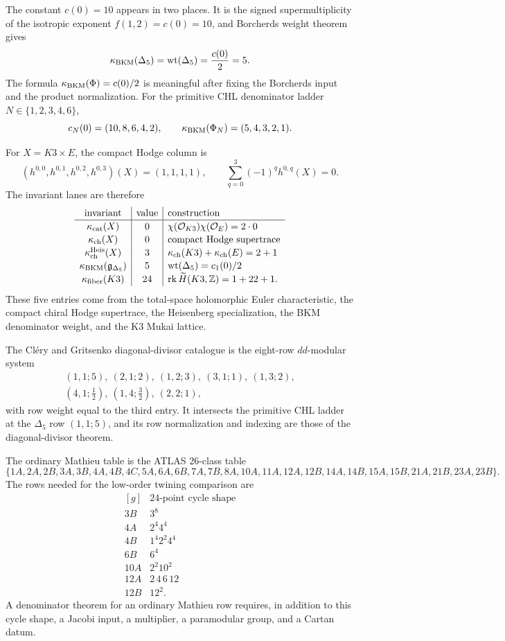 The constant \(c(0)=10\) appears in two places.  It is the signed
supermultiplicity of the isotropic exponent \(f(1,2)=c(0)=10\), and
Borcherds weight theorem gives
\[
  \kappa_{\mathrm{BKM}}(\Delta_5)
  =
  \operatorname{wt}(\Delta_5)
  =
  \frac{c(0)}{2}
  =
  5 .
\]
The formula \(\kappa_{\mathrm{BKM}}(\Phi)=c(0)/2\) is meaningful after fixing the
Borcherds input and the product normalization.  For the primitive CHL
denominator ladder \(N\in\{1,2,3,4,6\}\),
\[
  c_N(0)=(10,8,6,4,2),
  \qquad
  \kappa_{\mathrm{BKM}}(\Phi_N)=(5,4,3,2,1).
\]

For \(X=K3\times E\), the compact Hodge column is
\[
  (h^{0,0},h^{0,1},h^{0,2},h^{0,3})(X)=(1,1,1,1),
  \qquad
  \sum_{q=0}^{3}(-1)^q h^{0,q}(X)=0.
\]
The invariant lanes are therefore
\[
  \renewcommand{\arraystretch}{1.12}
  \begin{array}{c|c|l}
  \text{invariant} & \text{value} & \text{construction}\\ \hline
  \kappaCat(X) & 0 &
    \chi(\mathcal O_{K3})\chi(\mathcal O_E)=2\cdot 0\\
  \kappaCh(X) & 0 &
    \text{compact Hodge supertrace}\\
  \kappaHeis(X) & 3 &
    \kappaCh(K3)+\kappaCh(E)=2+1\\
  \kappaBKM(\gDeltaFive) & 5 &
    \operatorname{wt}(\Delta_5)=c_1(0)/2\\
  \kappaFiber(K3) & 24 &
    \operatorname{rk}\widetilde H(K3,\Z)=1+22+1 .
  \end{array}
\]
These five entries come from the total-space holomorphic Euler
characteristic, the compact chiral Hodge supertrace, the Heisenberg
specialization, the BKM denominator weight, and the K3 Mukai lattice.

The Cl\'ery and Gritsenko diagonal-divisor catalogue is the eight-row
\(dd\)-modular system
\[
\begin{gathered}
  (1,1;5),\ (2,1;2),\ (1,2;3),\ (3,1;1),\ (1,3;2),\\
  (4,1;\tfrac12),\ (1,4;\tfrac32),\ (2,2;1),
\end{gathered}
\]
with row weight equal to the third entry.  It intersects the primitive
CHL ladder at the \(\Delta_5\) row \((1,1;5)\), and its row
normalization and indexing are those of the diagonal-divisor theorem.

The ordinary Mathieu table is the ATLAS \(26\)-class table
\[
\{1A,2A,2B,3A,3B,4A,4B,4C,5A,6A,6B,7A,7B,
8A,10A,11A,12A,12B,14A,14B,15A,15B,21A,21B,23A,23B\}.
\]
The rows needed for the low-order twining comparison are
\[
  \renewcommand{\arraystretch}{1.12}
  \begin{array}{c|c}
  [g] & \text{\(24\)-point cycle shape}\\ \hline
  3B & 3^8\\
  4A & 2^4 4^4\\
  4B & 1^4 2^2 4^4\\
  6B & 6^4\\
  10A & 2^2 10^2\\
  12A & 2\,4\,6\,12\\
  12B & 12^2 .
  \end{array}
\]
A denominator theorem for an ordinary Mathieu row requires, in addition
to this cycle shape, a Jacobi input, a multiplier, a paramodular group,
and a Cartan datum.


